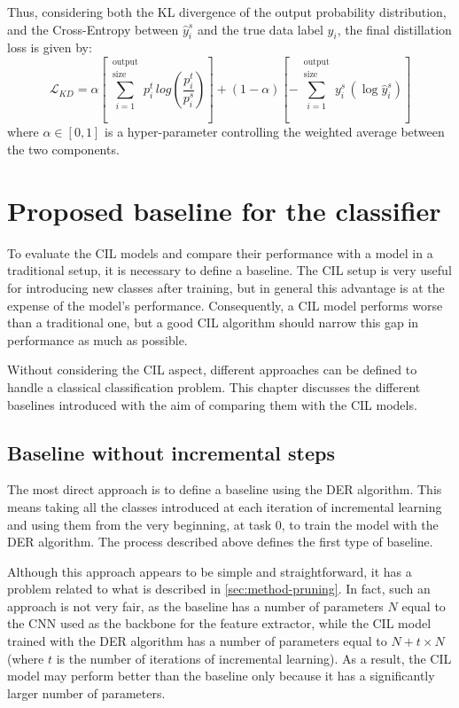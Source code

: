 Thus, considering both the KL divergence of the output probability distribution, and the Cross-Entropy between $\hat{y}_i^s$ and the true data label $y_i$, the final distillation loss is given by:
\begin{equation}
    \mathcal{L}_{KD} = \alpha \left[\sum_{i=1}^{\substack{\text{output}\\\text{size}}} p_i^t \, log \left( \frac{p_i^t}{p_i^s} \right) \right]
    + (1-\alpha) \left[-\sum_{i=1}^{\substack{\text{output}\\\text{size}}} y_i^s \, (\log \hat{y}_i^s) \right]
\end{equation}
where $\alpha \in [0, 1]$ is a hyper-parameter controlling the weighted average between the two components.

\section{Proposed baseline for the classifier}
\label{sec:method-baseline}
To evaluate the CIL models and compare their performance with a model in a traditional setup, it is necessary to define a baseline.
The CIL setup is very useful for introducing new classes after training, but in general this advantage is at the expense of the model's performance. Consequently, a CIL model performs worse than a traditional one, but a good CIL algorithm should narrow this gap in performance as much as possible.

Without considering the CIL aspect, different approaches can be defined to handle a classical classification problem. This chapter discusses the different baselines introduced with the aim of comparing them with the CIL models.

\subsection{Baseline without incremental steps}
\label{sec:method-baseline1}
The most direct approach is to define a baseline using the DER algorithm.
This means taking all the classes introduced at each iteration of incremental learning and using them from the very beginning, at task 0, to train the model with the DER algorithm.
The process described above defines the first type of baseline.

Although this approach appears to be simple and straightforward, it has a problem related to what is described in \autoref{sec:method-pruning}. In fact, such an approach is not very fair, as the baseline has a number of parameters $N$ equal to the CNN used as the backbone for the feature extractor, while the CIL model trained with the DER algorithm has a number of parameters equal to $N + t \times N$ (where $t$ is the number of iterations of incremental learning).
As a result, the CIL model may perform better than the baseline only because it has a significantly larger number of parameters.

